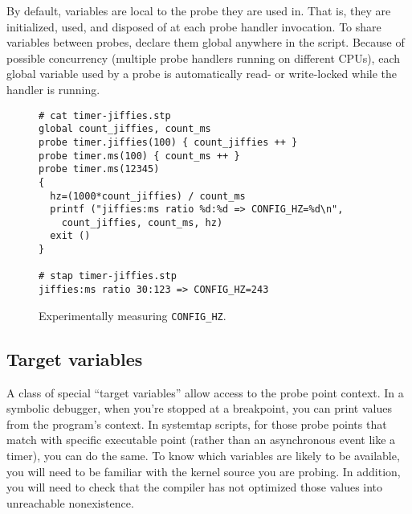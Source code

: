 \documentclass{article}
\newenvironment{boxedminipage}%
    {\begin{makeimage}\begin{center}\begin{Sbox}\begin{minipage}}%
    {\end{minipage}\end{Sbox}\fbox{\TheSbox}\end{center}\end{makeimage}}
\renewcommand{\nomenclature}[2]{}
\begin{document}
By default, variables are local to the probe they are used in.  That
is, they are initialized, used, and disposed of at each probe handler
invocation.  To share variables between probes, declare them global
anywhere in the script.  Because of possible concurrency (multiple
probe handlers running on different CPUs), each global variable used
by a probe is automatically read- or write-locked while the handler is
running.  \nomenclature{global variable}{A scalar, array, or aggregate that was
named in a \verb+global+ declaration, sharing that object amongst all
probe handlers and functions executed during a systemtap session.}
\nomenclature{locking}{An automated facility used by systemtap to
protect global variables against concurrent modification and/or
access.}

\begin{figure}[!ht]
\begin{boxedminipage}{4.5in}
\begin{verbatim}
# cat timer-jiffies.stp
global count_jiffies, count_ms
probe timer.jiffies(100) { count_jiffies ++ }
probe timer.ms(100) { count_ms ++ }
probe timer.ms(12345) 
{
  hz=(1000*count_jiffies) / count_ms
  printf ("jiffies:ms ratio %d:%d => CONFIG_HZ=%d\n",
    count_jiffies, count_ms, hz)
  exit ()
}

# stap timer-jiffies.stp
jiffies:ms ratio 30:123 => CONFIG_HZ=243
\end{verbatim}
\end{boxedminipage}
\caption{Experimentally measuring {\tt CONFIG\_HZ}.}
\label{fig:timer-jiffies}
\end{figure}

\subsection{Target variables}

A class of special ``target variables'' allow access to the probe
point context.  \nomenclature{target variable}{A value that may be
extracted from the kernel context of the probe point, such as a
parameter or local variable within a probed function.}  In a symbolic
debugger, when you're stopped at a breakpoint, you can print values
from the program's context.  In systemtap scripts, for those probe
points that match with specific executable point (rather than an
asynchronous event like a timer), you can do the same.  To know which
variables are likely to be available, you will need to be familiar
with the kernel source you are probing.  In addition, you will need to
check that the compiler has not optimized those values into
unreachable nonexistence.
\end{document}
